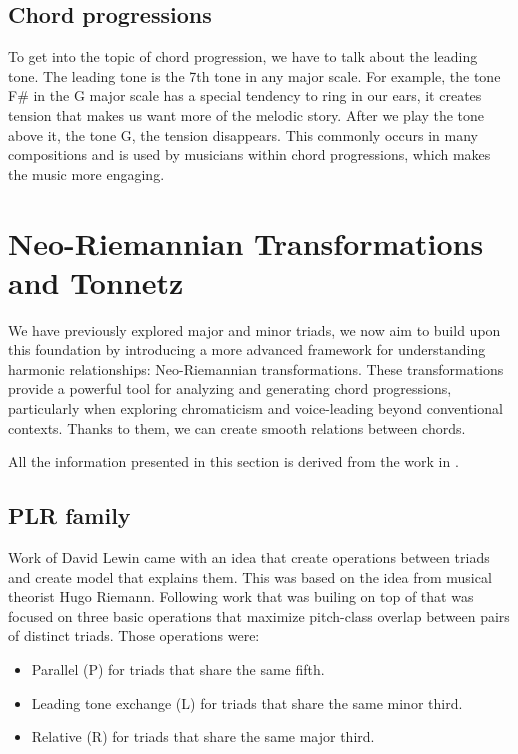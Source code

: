 \subsection*{Chord progressions}
To get into the topic of chord progression, we have to talk about the leading tone. The leading tone is the 7th tone in any major scale. For example, the tone F\# in the G major scale has a special tendency to ring in our ears, it creates tension that makes us want more of the melodic story. After we play the tone above it, the tone G, the tension disappears. This commonly occurs in many compositions and is used by musicians within chord progressions, which makes the music more engaging.

\section{Neo-Riemannian Transformations and Tonnetz}
We have previously explored major and minor triads, we now aim to build upon this foundation by introducing a more advanced framework for understanding harmonic relationships: Neo-Riemannian transformations. These transformations provide a powerful tool for analyzing and generating chord progressions, particularly when exploring chromaticism and voice-leading beyond conventional contexts. Thanks to them, we can create smooth relations between chords.

All the information presented in this section is derived from the work in \cite{neo-riemannian, absil2025schillinger, mansonthesis}.

\subsection*{PLR family}

Work of David Lewin came with an idea that create operations between triads and create model that explains them. This was based on the idea from musical theorist Hugo Riemann. Following work that was builing on top of that was focused on three basic operations that maximize pitch-class overlap between pairs of distinct triads. Those operations were:

\begin{itemize}
    \item{Parallel (P) for triads that share the same fifth.}
    \item{Leading tone exchange (L) for triads that share the same minor third.}
    \item{Relative (R) for triads that share the same major third.}
\end{itemize}

